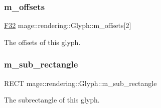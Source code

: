 \subsubsection{\texorpdfstring{m\+\_\+offsets}{m\_offsets}}
{\footnotesize\ttfamily \hyperlink{namespacemage_aa97e833b45f06d60a0a9c4fc22ae02c0}{F32} mage\+::rendering\+::\+Glyph\+::m\+\_\+offsets\mbox{[}2\mbox{]}}

The offsets of this glyph. \hypertarget{structmage_1_1rendering_1_1_glyph_a3f7a2867c509f66aab1271ecebf3be77}{}\label{structmage_1_1rendering_1_1_glyph_a3f7a2867c509f66aab1271ecebf3be77} 
\subsubsection{\texorpdfstring{m\+\_\+sub\+\_\+rectangle}{m\_sub\_rectangle}}
{\footnotesize\ttfamily R\+E\+CT mage\+::rendering\+::\+Glyph\+::m\+\_\+sub\+\_\+rectangle}

The subrectangle of this glyph. 